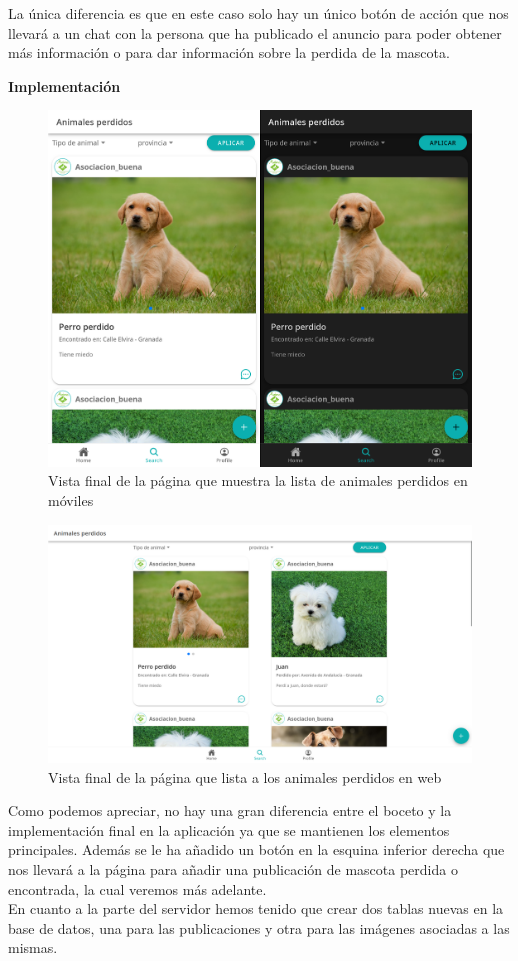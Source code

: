 La única diferencia es que en este caso solo hay un único botón de acción que nos llevará a un chat con la persona que ha publicado el anuncio para poder obtener más información o para dar información sobre la perdida de la mascota.

\textbf{Implementación}
\begin{figure}[H]
	\centering
	\includegraphics[width=0.5\linewidth]{"sprint 2/hu3/disenoFinal"}
	\caption{Vista final de la página que muestra la lista de animales perdidos en móviles}
	\label{fig:listaAdop}
\end{figure}

\begin{figure}[H]
	\centering
	\includegraphics[width=0.8\linewidth]{"sprint 2/hu3/disenoFinalWeb"}
	\caption{Vista final de la página que lista a los animales perdidos en web}
	\label{fig:disenofinalweb}
\end{figure}

Como podemos apreciar, no hay una gran diferencia entre el boceto y la implementación final en la aplicación ya que se mantienen los elementos principales. Además se le ha añadido un botón en la esquina inferior derecha que nos llevará a la página  para añadir una publicación de mascota perdida o encontrada, la cual veremos más adelante.\\

En cuanto a la parte del servidor hemos tenido que crear dos tablas nuevas en la base de datos, una para las publicaciones y otra para las imágenes asociadas a las mismas.\\

